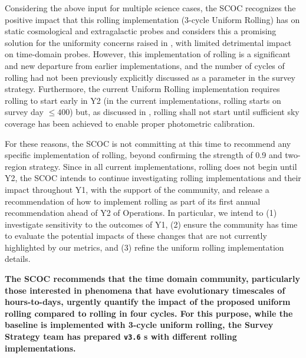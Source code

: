Considering the above input for multiple science cases, the SCOC recognizes the positive impact that this rolling implementation (3-cycle Uniform Rolling) has on static cosmological and extragalactic probes and considers this a promising solution for the uniformity concerns raised in , with limited detrimental impact on time-domain probes. However, this implementation of rolling is a significant and new departure from earlier implementations, and the number of cycles of rolling had not been previously explicitly discussed as a parameter in the survey strategy. Furthermore, the current Uniform Rolling implementation requires rolling to start early in Y2 (in the current implementations, rolling starts on survey day $\leq 400$) but, as discussed in , rolling shall not start until sufficient sky coverage has been achieved to enable proper photometric calibration.%

For these reasons, the SCOC is not committing at this time to recommend any specific implementation of rolling, beyond confirming the strength of 0.9 and two-region strategy. Since in all current implementations,
rolling does not begin until Y2, the SCOC intends to continue investigating rolling implementations and their impact throughout Y1, with the support of the community, and release a recommendation of how to implement rolling as part of its first annual recommendation ahead of Y2 of Operations. In particular, we intend to (1) investigate sensitivity to the outcomes of Y1, (2) ensure the community has time to evaluate the potential impacts of these changes that are not currently highlighted by our metrics, and (3) refine the uniform rolling implementation details.

{\bf The SCOC recommends that the time domain community, particularly those interested in phenomena that have evolutionary timescales of hours-to-days, urgently quantify the impact of the proposed uniform rolling compared to rolling in four cycles. For this purpose, while the baseline is implemented with 3-cycle uniform rolling, the Survey Strategy team has prepared \texttt{v3.6} \opsim s  with different rolling implementations.}

